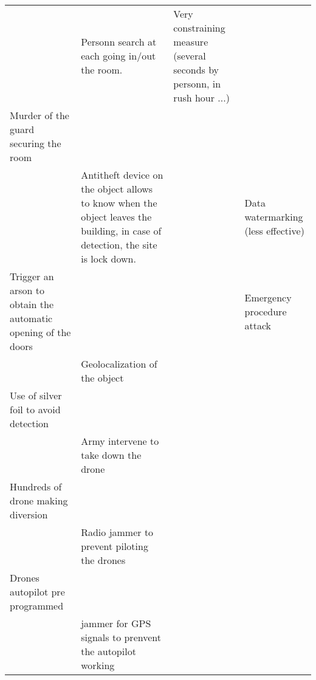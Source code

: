 \documentclass[11pt]{article} %
\begin{document}
\begin{longtable}{|p{3cm}|p{3cm}|p{3cm}|p{3cm}|}
& Personn search at each going in/out the room. & Very constraining measure
 (several seconds by personn, in rush hour ...) & \\
Murder of the guard securing the room & & & \\	 	 
& Antitheft device on the object allows to know when the object leaves the building, 
in case of detection, the site is lock down. & & Data watermarking (less effective) \\
Trigger an arson to obtain the automatic opening of the doors & & &
Emergency procedure attack \\
& Geolocalization of the object & & \\
 Use of silver foil to avoid detection & & & \\
 & Army intervene to take down the drone & & \\
 Hundreds of drone making diversion & & & \\
& Radio jammer to prevent piloting the drones & & \\
 Drones autopilot pre programmed & & & \\	 
  & jammer for GPS signals to prenvent the autopilot working & & \\

\end{longtable}
\end{document}
